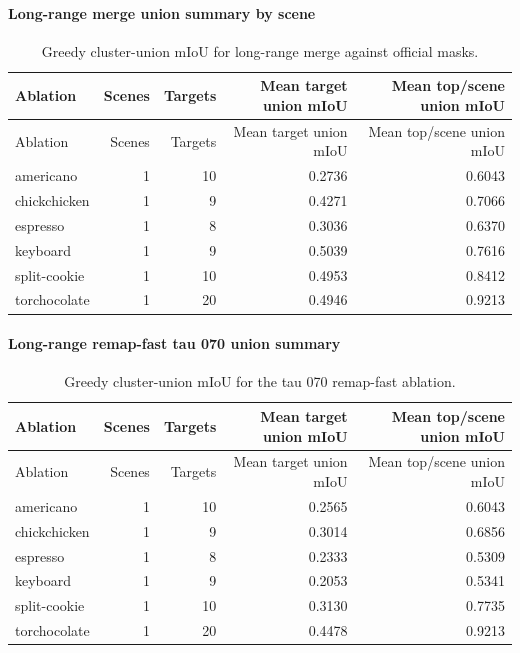 \documentclass[10pt]{article}
\begin{document}
\paragraph{Long-range merge union summary by scene}
\small
\begin{longtable}{lrrrr}
\caption{Greedy cluster-union mIoU for long-range merge against official masks.}\\
\toprule
Ablation & Scenes & Targets & Mean target union mIoU & Mean top/scene union mIoU \\
\midrule
\endfirsthead
\toprule
Ablation & Scenes & Targets & Mean target union mIoU & Mean top/scene union mIoU \\
\midrule
\endhead
americano & 1 & 10 & 0.2736 & 0.6043 \\
chickchicken & 1 & 9 & 0.4271 & 0.7066 \\
espresso & 1 & 8 & 0.3036 & 0.6370 \\
keyboard & 1 & 9 & 0.5039 & 0.7616 \\
split-cookie & 1 & 10 & 0.4953 & 0.8412 \\
torchocolate & 1 & 20 & 0.4946 & 0.9213 \\
\bottomrule
\end{longtable}
\normalsize

\paragraph{Long-range remap-fast tau 070 union summary}
\small
\begin{longtable}{lrrrr}
\caption{Greedy cluster-union mIoU for the tau 070 remap-fast ablation.}\\
\toprule
Ablation & Scenes & Targets & Mean target union mIoU & Mean top/scene union mIoU \\
\midrule
\endfirsthead
\toprule
Ablation & Scenes & Targets & Mean target union mIoU & Mean top/scene union mIoU \\
\midrule
\endhead
americano & 1 & 10 & 0.2565 & 0.6043 \\
chickchicken & 1 & 9 & 0.3014 & 0.6856 \\
espresso & 1 & 8 & 0.2333 & 0.5309 \\
keyboard & 1 & 9 & 0.2053 & 0.5341 \\
split-cookie & 1 & 10 & 0.3130 & 0.7735 \\
torchocolate & 1 & 20 & 0.4478 & 0.9213 \\
\bottomrule
\end{longtable}
\normalsize
\end{document}

